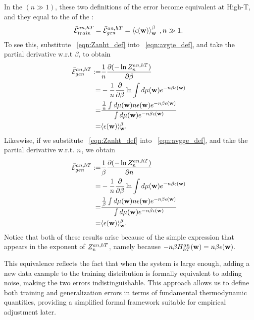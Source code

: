 In the \ThermodynamicLimit $(n \gg 1)$, these two definitions of the error become equivalent at High-T,
and they equal to the \ThermalAverage of the \EffectivePotential:
\begin{align}
  \bar{\mathcal{E}}_{train}^{an, hT} = \bar{\mathcal{E}}_{gen}^{an, hT} = \left\langle \epsilon({\mathbf{w}}) \right\rangle_{\mathbf w}^{\beta}\;,n\gg 1 .
\end{align}
To see this, substitute \EQN~\ref{eqn:Zanht_def} into \EQN~\ref{eqn:avgte_def}, and take the partial derivative w.r.t $\beta$, to obtain
\begin{align}
  \label{eqn:avgge_anhT}
  \bar{\mathcal{E}}_{gen}^{an, hT} :=&\frac{1}{n}\dfrac{\partial (-\ln Z^{an,hT}_{n})}{\partial \beta}  \nonumber \\
   =& - \dfrac{1}{n}\dfrac{\partial}{\partial \beta}\ln\int d\mu({\mathbf{w}})e^{-n\beta\epsilon({\mathbf{w}})} \\  \nonumber
   =&  \dfrac{
              \tfrac{1}{n}  \int  d\mu({\mathbf{w}}) n\epsilon({\mathbf{w}}) e^{-n\beta\epsilon({\mathbf{w}})} 
             }{
              \int  d\mu({\mathbf{w}}) e^{-n\beta\epsilon({\mathbf{w}})} 
   } \nonumber \\
   =&\langle\epsilon({\mathbf{w}}) \rangle_{{\mathbf{w}}}^{\beta} .
  \end{align}
Likeswise, if we substitute \EQN~\ref{eqn:Zanht_def} into \EQN~\ref{eqn:avgge_def}, and take the partial derivative w.r.t. $n$, we obtain
\begin{align}
  \label{eqn:avgte_anhT}
    \bar{\mathcal{E}}_{gen}^{an, hT}  :=& \frac{1}{\beta}\dfrac{\partial (-\ln Z^{an,hT}_{n})}{\partial n} \nonumber \\
    =& - \dfrac{1}{n}\dfrac{\partial}{\partial \beta}\ln\int d\mu({\mathbf{w}})e^{-n\beta\epsilon({\mathbf{w}})} \\  \nonumber
   =&  \dfrac{
              \tfrac{1}{\beta}  \int  d\mu({\mathbf{w}}) n\epsilon({\mathbf{w}}) e^{-n\beta\epsilon({\mathbf{w}})} 
             }{
     \int  d\mu({\mathbf{w}}) e^{-n\beta\epsilon({\mathbf{w}})} 
   } \nonumber \\
   =&\langle\epsilon({\mathbf{w}}) \rangle_{{\mathbf{w}}}^{\beta} .
\end{align}
Notice that both of these results arise because of the simple expression that appears in the exponent of $Z^{an,hT}_{n}$, namely because $-n\beta H^{an}_{hT}({\mathbf{w}})=n\beta\epsilon({\mathbf{w}})$.


This equivalence reflects the fact that when the system is large enough, adding a new data example to the
training distribution is formally equivalent to adding noise, making the two errors indistinguishable.
This approach allows us to define both training and generalization errors in terms of fundamental thermodynamic quantities,
providing a simplified formal framework suitable for empirical adjustment later.

